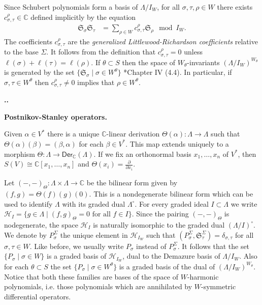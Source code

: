 \documentclass[11pt,fleqn]{amsart}
\renewcommand\thesection{\arabic{section}}
\newcounter{para}[section]
\renewcommand\thepara{\thesection.\arabic{para}}
\def\paragraph{%
 \noindent
 \refstepcounter{para}%
 \textbf{\thepara.}\hspace{1ex}%
}
\newcommand\about[1]{%
 {\bfseries#1.}%
}
\newcommand\CC{\mathbb C}
\renewcommand\to{\longrightarrow}
\renewcommand\SS{\mathfrak S}
\begin{document}
Since Schubert polynomials form a basis of $\Lambda / I_W$, for all $\sigma,
\tau, \rho \in W$ there exists $c_{\sigma, \tau}^\rho \in \CC$ defined 
implicitly by the equation
\begin{align*}
\SS_\sigma \SS_\tau 
	&= \sum_{\rho \in W} c^\rho_{\sigma, \tau} \SS_\rho \mod I_W.
\end{align*}
The coefficients $c_{\sigma, \tau}^\rho$ are the \emph{generalized 
Littlewood-Richardson coefficients} relative to the base $\Sigma$. It follows 
from the definition that $c^\rho_{\sigma, \tau} = 0$ unless $\ell(\sigma) + 
\ell(\tau) = \ell(\rho)$. If $\theta \subset S$ then the space of 
$W_\theta$-invariants $(\Lambda/I_W)^{W_\theta}$ is generated by the set 
$\{\SS_\sigma \mid \sigma \in W^\theta\}$ 
\cite{Hiller-coxeter-book}*{Chapter IV (4.4)}. In particular, if $\sigma, 
\tau \in W^\theta$ then $c^{\rho}_{\sigma, \tau} \neq 0$ implies that 
$\rho \in W^\theta$. 

\paragraph
\about{Postnikov-Stanley operators}
\label{ps-operators}
Given $\alpha \in V^*$ there is a unique $\CC$-linear derivation 
$\Theta(\alpha): \Lambda \to \Lambda$ such that $\Theta(\alpha)(\beta) = 
(\beta, \alpha)$ for each $\beta \in V^*$. This map extends uniquely to a 
morphism $\Theta: \Lambda \to \mathsf{Der}_\CC(\Lambda)$. If we fix an 
orthonormal basis $x_1, \ldots, x_n$ of $V^*$, then $S(V) \cong \CC[x_1, 
\ldots, x_n]$ and $\Theta(x_i) = \frac{\partial}{\partial x_i}$.

Let $(-,-)_\Theta: \Lambda \times \Lambda \to \CC$ be the bilinear form given 
by $(f,g) = \Theta(f)(g)(0)$. This is a nondegenerate bilinear form which can 
be used to identify $\Lambda$ with its graded dual $\Lambda^\circ$. For every graded ideal $I 
\subset \Lambda$ we write $\mathcal H_I = \{g \in \Lambda \mid (f,g)_\Theta = 0
\mbox{ for all } f \in I\}$. Since the pairing $(-,-)_\Theta$ is nodegenerate, 
the space $\mathcal H_I$ is naturally isomorphic to the graded dual 
$(\Lambda/I)^\circ$. We denote by $P_\sigma^\Sigma$ the unique element in 
$\mathcal H_{I_W}$ such that $(P_\sigma^\Sigma, \SS_{\tau}^\Sigma) = 
\delta_{\sigma, \tau}$ for all $\sigma, \tau \in W$. Like before, we usually 
write $P_\sigma$ instead of $P_\sigma^\Sigma$. It follows that the set 
$\{P_\sigma \mid \sigma \in W\}$ is a graded basis of $\mathcal H_{I_W}$, dual 
to the Demazure basis of $\Lambda/I_W$. Also for each $\theta \subset S$ the 
set $\{P_\sigma \mid \sigma \in W^\theta\}$ is a graded basis of the dual of 
$(\Lambda/I_W)^{W_\theta}$. Notice that both these families are bases of
the space of $W$-harmonic polynomials, i.e. those polynomials which are 
annihilated by $W$-symmetric differential operators.
\end{document}
